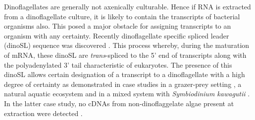 \documentclass[12pt]{article}
\begin{document}
Dinoflagellates are generally not axenically culturable. Hence if RNA is extracted from a dinoflagellate culture, it is likely to contain the transcripts of bacterial organisms also. This posed a major obstacle for assigning transcripts to an organism with any certainty. Recently dinoflagellate specific spliced leader (dinoSL) sequence was discovered \cite{zhang2007spliced}. This process whereby, during the maturation of mRNA, these dinoSL are \emph{trans}-spliced to the 5' end of transcripts along with the polyadenylated 3' tail characteristic of eukaryotes. The presence of this dinoSL allows certain designation of a transcript to a dinoflagellate  with a high degree of certainty as demonstrated in case studies in a grazer-prey setting \cite{lin2010dinoflagellate}, a natural aquatic ecosystem \cite{lin2010spliced} and in a mixed system with \emph{Symbiodinium kawagutii} \cite{zhang2013proof}. In the latter case study, no cDNAs from non-dinoflaggelate algae present at extraction were detected \cite{zhang2013proof}.
\end{document}
